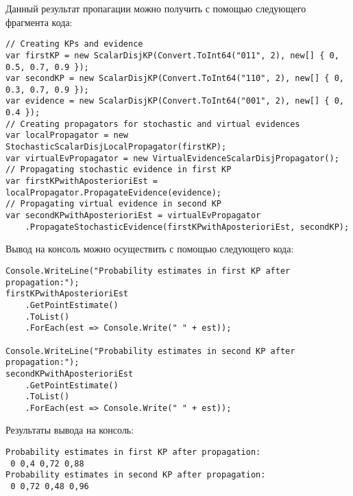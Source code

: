 Данный результат пропагации можно получить с помощью следующего фрагмента кода:
\begin{lstlisting}[caption = Пример пропагации виртуального свидетельства]
// Creating KPs and evidence
var firstKP = new ScalarDisjKP(Convert.ToInt64("011", 2), new[] { 0, 0.5, 0.7, 0.9 });
var secondKP = new ScalarDisjKP(Convert.ToInt64("110", 2), new[] { 0, 0.3, 0.7, 0.9 });
var evidence = new ScalarDisjKP(Convert.ToInt64("001", 2), new[] { 0, 0.4 });
// Creating propagators for stochastic and virtual evidences
var localPropagator = new StochasticScalarDisjLocalPropagator(firstKP);
var virtualEvPropagator = new VirtualEvidenceScalarDisjPropagator();
// Propagating stochastic evidence in first KP
var firstKPwithAposterioriEst = localPropagator.PropagateEvidence(evidence); 
// Propagating virtual evidence in second KP
var secondKPwithAposterioriEst = virtualEvPropagator
    .PropagateStochasticEvidence(firstKPwithAposterioriEst, secondKP);
\end{lstlisting}

Вывод на консоль можно осуществить с помощью следующего кода:
\begin{lstlisting}[caption = Вывод результатов на консоль]
Console.WriteLine("Probability estimates in first KP after propagation:");
firstKPwithAposterioriEst
    .GetPointEstimate()
    .ToList()
    .ForEach(est => Console.Write(" " + est));

Console.WriteLine("Probability estimates in second KP after propagation:");
secondKPwithAposterioriEst
    .GetPointEstimate()
    .ToList()
    .ForEach(est => Console.Write(" " + est));
\end{lstlisting}

Результаты вывода на консоль:
\begin{lstlisting}[caption = Результаты]
Probability estimates in first KP after propagation:
 0 0,4 0,72 0,88
Probability estimates in second KP after propagation:
 0 0,72 0,48 0,96
\end{lstlisting}
